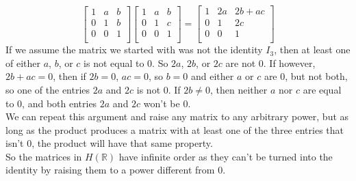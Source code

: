 \documentclass{article}
\newcommand{\R}{\mathbb{R}}
\begin{document}
\begin{enumerate}[label=\textbf{\alph*.}]
\[\begin{bmatrix}
                1 & a & b \\
                0 & 1 & b \\
                0 & 0 & 1 \\
            \end{bmatrix}
            \begin{bmatrix}
                1 & a & b \\
                0 & 1 & c \\
                0 & 0 & 1 \\
            \end{bmatrix}
            = \begin{bmatrix}
                1 & 2a & 2b + ac \\
                0 & 1 & 2c \\
                0 & 0 & 1 \\
            \end{bmatrix} \]
            If we assume the matrix we started with was not the identity $I_3$,
            then at least one of either $a$, $b$, or $c$ is not equal to 0.
            So $2a$, $2b$, or $2c$ are not 0.
            If however, $2b + ac = 0$,
            then if $2b = 0$, $ac = 0$,
            so $b = 0$ and either $a$ or $c$ are 0, but not both,
            so one of the entries $2a$ and $2c$ is not 0.
            If $2b \neq 0$, then neither $a$ nor $c$ are equal to 0, and
            both entries $2a$ and $2c$ won't be 0. \\
            We can repeat this argument and raise any matrix to any
            arbitrary power,
            but as long as the product produces a matrix with at least one
            of the three entries that isn't 0, the product will have 
            that same property. \\
            So the matrices in $H(\R)$ have infinite order as they can't
            be turned into the identity by raising them to a power different
            from 0. 
    \end{enumerate}
\end{document}
